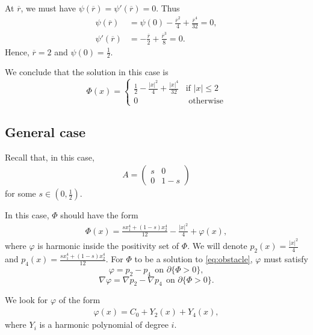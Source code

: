 \documentclass[10pt,a4paper]{article}
\numberwithin{equation}{section}
\begin{document}
At $\overline{r}$, we must have $\psi(\overline{r}) = \psi'(\overline{r}) =0$. Thus
\begin{align*}
	\psi(\overline{r}) &= \psi(0) - \frac{\overline{r}^{2}}{4} +  \frac{\overline{r}^4}{32} = 0, \\
	\psi'(\overline{r}) &= -\frac{\overline{r}}{2} + \frac{\overline{r}^{3}}{8} = 0.
\end{align*}
Hence, $\overline{r} = 2$ and $\psi(0) = \frac{1}{2}$.

We conclude that the solution in this case is 
\begin{equation}
\label{eq:solution_radial}
\Phi(x) = \begin{cases}
	\frac{1}{2} - \frac{|x|^{2}}{4} + \frac{|x|^{4}}{32} & \text{if } |x| \leq 2\\
	0 & \text{ otherwise}
\end{cases}
\end{equation} 

\subsection{General case}
\label{ssect:general_case}

Recall that, in this case, 
\begin{align*}
A = \begin{pmatrix}
	s & 0 \\
	0 & 1-s
\end{pmatrix}
\end{align*}
for some $s \in (0, \frac{1}{2})$.

In this case, $\Phi$ should have the form
\begin{align*}
\Phi(x) = \frac{s x_1^4 + (1-s) x_2^4}{12} - \frac{|x|^2}{4} + \varphi(x),
\end{align*}
where $\varphi$ is harmonic inside the positivity set of $\Phi$. We will denote $p_2(x) = \frac{|x|^2}{4}$ and $p_4(x) = \frac{s x_1^4 + (1-s) x_2^4}{12}$. For $\Phi$ to be a solution to \eqref{eq:obstacle}, $\varphi$ must satisfy
\begin{equation}
\label{eq:bc_zero}
\varphi = p_2 - p_4 ~~ \text{on }\partial\{\Phi>0\},
\end{equation}
\begin{equation}
\label{eq:bc_one}
\nabla\varphi = \nabla p_2 - \nabla p_4 ~~ \text{on } \partial\{\Phi>0\}.
\end{equation}

We look for $\varphi$ of the form
\begin{align*}
\varphi(x) = C_0 + Y_2(x) + Y_4(x),
\end{align*}
where $Y_i$ is a harmonic polynomial of degree $i$.
\end{document}
